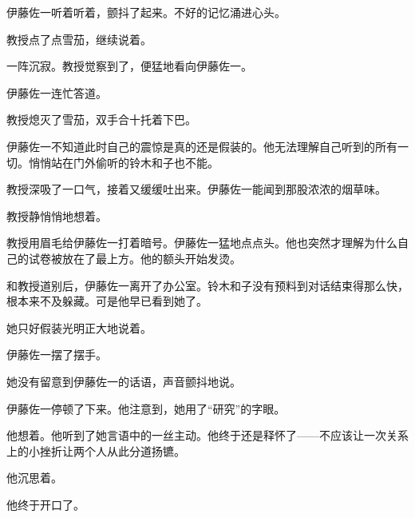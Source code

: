 

伊藤佐一听着听着，颤抖了起来。不好的记忆涌进心头。

教授点了点雪茄，继续说着。

一阵沉寂。教授觉察到了，便猛地看向伊藤佐一。

伊藤佐一连忙答道。

教授熄灭了雪茄，双手合十托着下巴。

伊藤佐一不知道此时自己的震惊是真的还是假装的。他无法理解自己听到的所有一切。悄悄站在门外偷听的铃木和子也不能。



教授深吸了一口气，接着又缓缓吐出来。伊藤佐一能闻到那股浓浓的烟草味。


教授静悄悄地想着。

教授用眉毛给伊藤佐一打着暗号。伊藤佐一猛地点点头。他也突然才理解为什么自己的试卷被放在了最上方。他的额头开始发烫。

和教授道别后，伊藤佐一离开了办公室。铃木和子没有预料到对话结束得那么快，根本来不及躲藏。可是他早已看到她了。

她只好假装光明正大地说着。


伊藤佐一摆了摆手。


她没有留意到伊藤佐一的话语，声音颤抖地说。

伊藤佐一停顿了下来。他注意到，她用了“研究”的字眼。

他想着。他听到了她言语中的一丝主动。他终于还是释怀了——不应该让一次关系上的小挫折让两个人从此分道扬镳。

他沉思着。

他终于开口了。

